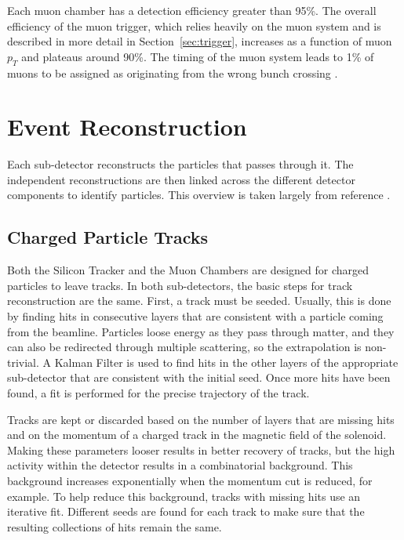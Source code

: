 Each muon chamber has a detection efficiency greater than 95\%.
The overall efficiency of the muon trigger, which relies heavily on the muon system
and is described in more detail in Section~\ref{sec:trigger},
increases as a function of muon $p_T$ and plateaus around 90\%.
The timing of the muon system leads to 1\% of muons
to be assigned as originating from the wrong bunch crossing \cite{Pozzobon_2019}.

\section{Event Reconstruction} \label{sec:event-reco}

Each sub-detector reconstructs the particles that passes through it.
The independent reconstructions are then linked
across the different detector components to identify particles.
This overview is taken largely from reference
\cite{Sirunyan_2017}. 

\subsection{Charged Particle Tracks} \label{sec:tracks}

Both the Silicon Tracker and the Muon Chambers are designed
for charged particles to leave tracks.
In both sub-detectors, the basic steps for track reconstruction are the same.
First, a track must be seeded.
Usually, this is done by finding hits in consecutive layers that are consistent
with a particle coming from the beamline.
Particles loose energy as they pass through matter,
and they can also be redirected through multiple scattering,
so the extrapolation is non-trivial.
A Kalman Filter is used to find hits in the other layers of the appropriate sub-detector
that are consistent with the initial seed.
Once more hits have been found, a fit is performed for the precise trajectory of the track.

Tracks are kept or discarded based on the number of layers that are missing hits
and on the momentum of a charged track in the magnetic field of the solenoid.
Making these parameters looser results in better recovery of tracks,
but the high activity within the detector results in a combinatorial background.
This background increases exponentially when the momentum cut is reduced, for example.
To help reduce this background, tracks with missing hits use an iterative fit.
Different seeds are found for each track to make sure that the resulting collections
of hits remain the same.


